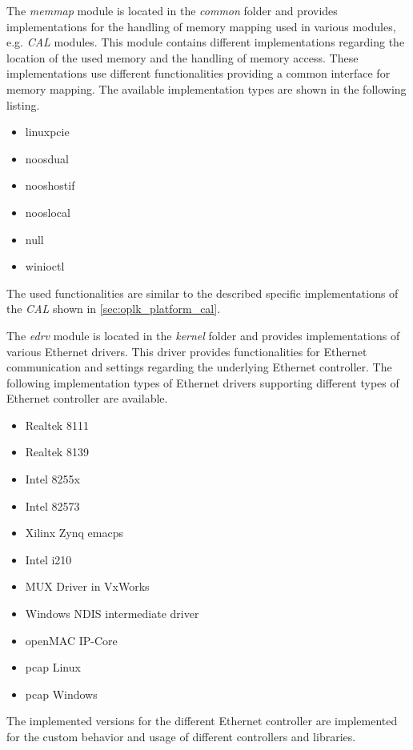 \begin{description}[leftmargin=1cm]
    \item[memmap] The \emph{memmap} module is located in the \emph{common} folder and provides implementations for the handling of memory mapping used in various modules, e.g. \emph{CAL} modules.
    This module contains different implementations regarding the location of the used memory and the handling of memory access.
    These implementations use different functionalities providing a common interface for memory mapping.
    The available implementation types are shown in the following listing.
    \begin{multicols}{3}
        \begin{itemize}
            \item linuxpcie
            \item noosdual
            \item nooshostif
            \item nooslocal
            \item null
            \item winioctl
        \end{itemize}
    \end{multicols}
    The used functionalities are similar to the described specific implementations of the \emph{CAL} shown in \ref{sec:oplk_platform_cal}.\\
    
    \item[edrv] The \emph{edrv} module is located in the \emph{kernel} folder and provides implementations of various Ethernet drivers.
    This driver provides functionalities for Ethernet communication and settings regarding the underlying Ethernet controller.
    The following implementation types of Ethernet drivers supporting different types of Ethernet controller are available.
    \begin{multicols}{3}
        \begin{itemize}
            \item Realtek 8111
            \item Realtek 8139
            \item Intel 8255x
            \item Intel 82573
            \item Xilinx Zynq emacps
            \item Intel i210
            \item MUX Driver in VxWorks
            \item Windows NDIS intermediate driver
            \item openMAC IP-Core
            \item pcap Linux
            \item pcap Windows
        \end{itemize}
    \end{multicols}
    The implemented versions for the different Ethernet controller are implemented for the custom behavior and usage of different controllers and libraries.
    \\
    

\end{description}
